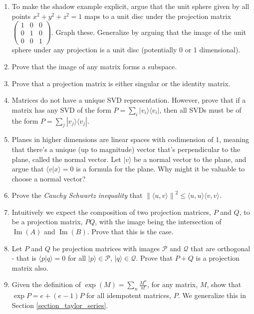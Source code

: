\documentclass{amsbook}
\begin{document}
\begin{enumerate}
\item To make the shadow example explicit, argue that the unit sphere given by all points $x^2+y^2+z^2=1$ maps to a unit disc under the projection matrix $\left(\begin{array}{ccc}1&0&0\\0&1&0\\0&0&1\end{array}\right)$.  Graph these.  Generalize by arguing that the image of the unit sphere under any projection is a unit disc (potentially 0 or 1 dimensional).
\item Prove that the image of any matrix forms a subspace.
\item Prove that a projection matrix is either singular or the identity matrix.
\item Matrices do not have a unique SVD representation.  However, prove that if a matrix has any SVD of the form $P=\sum_i|v_i\rangle\langle v_i|$, then all SVDs must be of the form $P=\sum_j|v_j\rangle\langle v_j|$.
\item Planes in higher dimensions are linear spaces with codimension of $1$, meaning that there's a unique (up to magnitude) vector that's perpendicular to the plane, called the normal vector.  Let $|v\rangle$ be a normal vector to the plane, and argue that $\langle v|x\rangle=0$ is a formula for the plane.  Why might it be valuable to choose a normal vector?
\item Prove the {\em Cauchy Schwartz inequality} that $\left\|\langle u,v\rangle\right\|^2\leq\langle u,u\rangle\langle v,v\rangle$.
\item Intuitively we expect the composition of two projection matrices, $P$ and $Q$, to be a projection matrix, $PQ$, with the image being the intersection of $\operatorname{Im}(A)$ and $\operatorname{Im}(B)$.  Prove that this is the case.
\item Let $P$ and $Q$ be projection matrices with images $\mathcal P$ and $\mathcal Q$ that are orthogonal - that is $\langle p|q\rangle=0$ for all $|p\rangle\in\mathcal P$, $|q\rangle\in\mathcal Q$.  Prove that $P+Q$ is a projection matrix also.
\item\label{idempotence_taylor} Given the definition of $\exp(M)=\sum_n\frac{M^n}{n!}$, for any matrix, $M$, show that $\exp{P}=e+(e-1)P$ for all idempotent matrices, $P$.  We generalize this in Section \ref{section_taylor_series}.
\end{enumerate}
\end{document}
